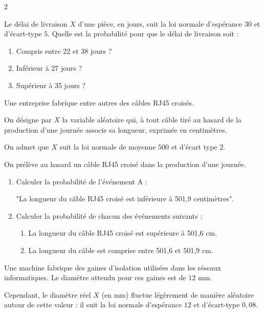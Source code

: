 \begin{multicols}{2}
\begin{exercice_cours}[\quad]{}
Le délai de livraison $X$ d’une pièce, en jours, suit la loi normale d’espérance $30$ et d’écart-type $5$.
Quelle est la probabilité pour que le délai de livraison soit :

\begin{enumerate}
	\item Compris entre 22 et 38 jours ? \dotfill
	\item Inférieur à 27 jours ? \dotfill
	\item Supérieur à 35 jours ? \dotfill
\end{enumerate}




\end{exercice_cours}
\begin{exercice_cours}[\quad]{}


Une entreprise fabrique entre autres des câbles RJ45 croisés.

On désigne par $X$ la variable aléatoire qui, à tout câble tiré au hasard de la production d'une journée associe sa longueur, exprimée en centimètres.

On admet que $X$ suit la loi normale de moyenne $500$ et d'écart type $2$.

On prélève au hasard un câble RJ45 croisé dans la production d'une journée.

\begin{enumerate}
	\item Calculer la probabilité de l'événement A :
	
	"La longueur du câble RJ45 croisé est inférieure à 501,9 centimètres". \dotfill
	\item Calculer la probabilité de chacun des événements suivants :
	\begin{enumerate}
		\item La longueur du câble RJ45 croisé est supérieure à 501,6 cm. \dotfill
		\item La longueur du câble est comprise entre 501,6 et 501,9 cm. \dotfill
	\end{enumerate}
\end{enumerate}

\end{exercice_cours}
\begin{exercice_cours}[\quad]{}


Une machine fabrique des gaines d'isolation utilisées dans les réseaux informatiques. Le diamètre attendu pour ces gaines est de $12$ mm.

Cependant, le diamètre réel $X$ (en mm) fluctue légèrement de manière aléatoire autour de cette valeur : il suit la loi normale d'espérance $12$ et d'écart-type $0,08$.


\end{exercice_cours}
\end{multicols}
